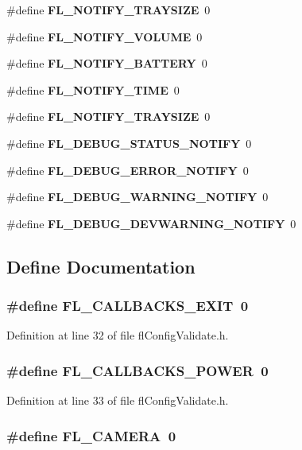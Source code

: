 \begin{CompactItemize}
\item 
\#define {\bf FL\_\-NOTIFY\_\-TRAYSIZE}~0
\item 
\#define {\bf FL\_\-NOTIFY\_\-VOLUME}~0
\item 
\#define {\bf FL\_\-NOTIFY\_\-BATTERY}~0
\item 
\#define {\bf FL\_\-NOTIFY\_\-TIME}~0
\item 
\#define {\bf FL\_\-NOTIFY\_\-TRAYSIZE}~0
\item 
\#define {\bf FL\_\-DEBUG\_\-STATUS\_\-NOTIFY}~0
\item 
\#define {\bf FL\_\-DEBUG\_\-ERROR\_\-NOTIFY}~0
\item 
\#define {\bf FL\_\-DEBUG\_\-WARNING\_\-NOTIFY}~0
\item 
\#define {\bf FL\_\-DEBUG\_\-DEVWARNING\_\-NOTIFY}~0
\end{CompactItemize}


\subsection{Define Documentation}
\subsubsection{\setlength{\rightskip}{0pt plus 5cm}\#define FL\_\-CALLBACKS\_\-EXIT~0}\label{flConfigValidate_8h_f8fdf74f16064484dfb0aa5dd50e1733}




Definition at line 32 of file fl\-Config\-Validate.h.
\subsubsection{\setlength{\rightskip}{0pt plus 5cm}\#define FL\_\-CALLBACKS\_\-POWER~0}\label{flConfigValidate_8h_87448450a6222c3f1acafdff8ab19228}




Definition at line 33 of file fl\-Config\-Validate.h.
\subsubsection{\setlength{\rightskip}{0pt plus 5cm}\#define FL\_\-CAMERA~0}\label{flConfigValidate_8h_a7de82853426d18ce06eefa638794755}




